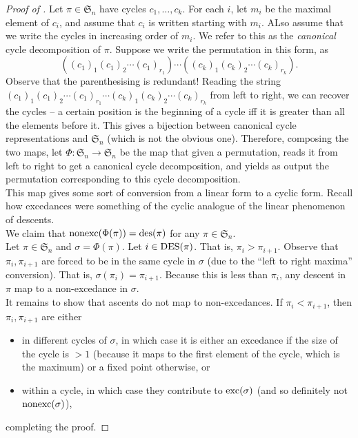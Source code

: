 	\begin{proof}[Proof of ]
		Let $\pi \in \mathfrak{S}_n$ have cycles $c_1,\ldots,c_k$. For each $i$, let $m_i$ be the maximal element of $c_i$, and assume that $c_i$ is written starting with $m_i$. ALso assume that we write the cycles in increasing order of $m_i$. We refer to this as the \emph{canonical} cycle decomposition of $\pi$. Suppose we write the permutation in this form, as
		\[ ( (c_1)_1 (c_1)_2 \cdots (c_1)_{r_1} ) \cdots ( (c_k)_1 (c_k)_2 \cdots (c_k)_{r_k} ). \]
		Observe that the parenthesising is redundant! Reading the string $(c_1)_1 (c_1)_2 \cdots (c_1)_{r_1} \cdots (c_k)_1 (c_k)_2 \cdots (c_k)_{r_k}$ from left to right, we can recover the cycles -- a certain position is the beginning of a cycle iff it is greater than all the elements before it. This gives a bijection between canonical cycle representations and $\mathfrak{S}_n$ (which is not the obvious one). Therefore, composing the two maps, let $\Phi : \mathfrak{S}_n \to \mathfrak{S}_n$ be the map that given a permutation, reads it from left to right to get a canonical cycle decomposition, and yields as output the permutation corresponding to this cycle decomposition.\\
		This map gives some sort of conversion from a linear form to a cyclic form. Recall how excedances were something of the cyclic analogue of the linear phenomenon of descents.\\

		We claim that $\operatorname{nonexc}(\Phi(\pi)) = \operatorname{des}(\pi)$ for any $\pi \in \mathfrak{S}_n$.\\
		Let $\pi \in \mathfrak{S}_n$ and $\sigma = \Phi(\pi)$. Let $i \in \operatorname{DES}(\pi)$. That is, $\pi_i > \pi_{i+1}$. Observe that $\pi_i,\pi_{i+1}$ are forced to be in the same cycle in $\sigma$ (due to the ``left to right maxima'' conversion). That is, $\sigma(\pi_i) = \pi_{i+1}$. Because this is less than $\pi_i$, any descent in $\pi$ map to a non-excedance in $\sigma$.\\
		It remains to show that ascents do not map to non-excedances. If $\pi_{i} < \pi_{i+1}$, then $\pi_i,\pi_{i+1}$ are either
		\begin{itemize}
			\item in different cycles of $\sigma$, in which case it is either an excedance if the size of the cycle is $>1$ (because it maps to the first element of the cycle, which is the maximum) or a fixed point otherwise, or
			\item within a cycle, in which case they contribute to $\operatorname{exc}(\sigma)$ (and so definitely not $\operatorname{nonexc}(\sigma)$),
		\end{itemize}
		completing the proof.
	\end{proof}

